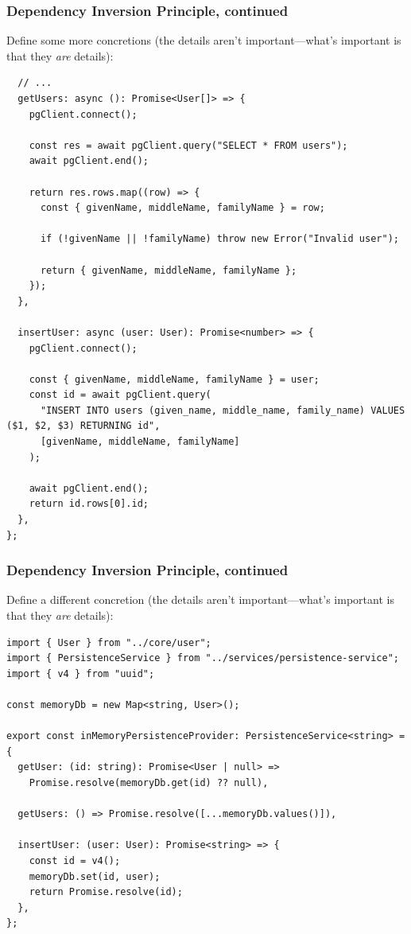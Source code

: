 \documentclass[aspectratio=169]{beamer}
\begin{document}
\begin{frame}[fragile]
  \frametitle{Dependency Inversion Principle, continued}
  Define some more concretions (the details aren't important---what's important
  is that they \emph{are} details):
  \begin{verbatim}
  // ...
  getUsers: async (): Promise<User[]> => {
    pgClient.connect();

    const res = await pgClient.query("SELECT * FROM users");
    await pgClient.end();

    return res.rows.map((row) => {
      const { givenName, middleName, familyName } = row;

      if (!givenName || !familyName) throw new Error("Invalid user");

      return { givenName, middleName, familyName };
    });
  },

  insertUser: async (user: User): Promise<number> => {
    pgClient.connect();

    const { givenName, middleName, familyName } = user;
    const id = await pgClient.query(
      "INSERT INTO users (given_name, middle_name, family_name) VALUES ($1, $2, $3) RETURNING id",
      [givenName, middleName, familyName]
    );

    await pgClient.end();
    return id.rows[0].id;
  },
};
  \end{verbatim}
\end{frame}

\begin{frame}[fragile]
  \frametitle{Dependency Inversion Principle, continued}
  Define a different concretion (the details aren't important---what's important
  is that they \emph{are} details):

  \vspace{1em}

  \begin{verbatim}
import { User } from "../core/user";
import { PersistenceService } from "../services/persistence-service";
import { v4 } from "uuid";

const memoryDb = new Map<string, User>();

export const inMemoryPersistenceProvider: PersistenceService<string> = {
  getUser: (id: string): Promise<User | null> =>
    Promise.resolve(memoryDb.get(id) ?? null),

  getUsers: () => Promise.resolve([...memoryDb.values()]),

  insertUser: (user: User): Promise<string> => {
    const id = v4();
    memoryDb.set(id, user);
    return Promise.resolve(id);
  },
};
  \end{verbatim}
\end{frame}
\end{document}
